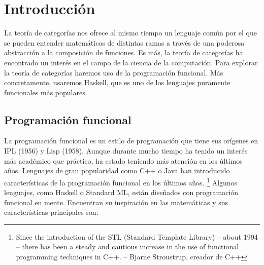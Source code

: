 \chapter{Introducción}
La teoría de categorías nos ofrece al mismo tiempo un lenguaje común por el que se pueden entender matemáticos de distintas ramas a través de una poderosa abstracción a la composición de funciones.
Es más, la teoría de categorías ha encontrado un interés en el campo de la ciencia de la computación.
Para explorar la teoría de categorías haremos uso de la programación funcional.
Más concretamente, usaremos Haskell, que es uno de los lenguajes puramente funcionales más populares.

\section{Programación funcional}
La programación funcional es un estilo de programación que tiene sus orígenes en IPL (1956) y Lisp (1958).
Aunque durante mucho tiempo ha tenido un interés más académico que práctico, ha estado teniendo más atención en los últimos años.
Lenguajes de gran popularidad como C++ o Java han introducido características de la programación funcional en los últimos años.
\footnote{Since the introduction of the STL (Standard Template Library) -- about 1994 -- there has been a steady and cautious increase in the use of functional programming techniques in C++. -- Bjarne Stroustrup, creador de C++}
Algunos lenguajes, como Haskell o Standard ML, están diseñados con programación funcional en mente.
Encuentran su inspiración en las matemáticas y sus características principales son:

